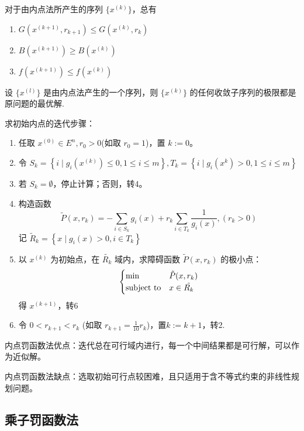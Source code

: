 \begin{theorem}
    对于由内点法所产生的序列 $\{x^{(k)}\}$，总有\begin{enumerate}
        \item $G(x^{(k + 1)}, r_{k + 1}) \le G(x^{(k)}, r_k)$
        \item $B(x^{(k + 1)}) \ge B(x^{(k)})$
        \item $f(x^{(k + 1)}) \le f(x^{(k)})$
    \end{enumerate}
\end{theorem}

\begin{theorem}
    设 $\{x^{(l)}\}$ 是由内点法产生的一个序列，则 $\{x^{(k)}\}$ 的任何收敛子序列的极限都是原问题的最优解.
\end{theorem}

\begin{remark}
    求初始内点的迭代步骤：\begin{enumerate}
        \item 任取 $x^{(0)} \in E^n, r_0 > 0$(如取 $r_0 = 1$)，置 $k := 0$。
        \item 令 $S_k = \left\{i \mid g_i(x^{(k)}) \le 0, 1 \le i \le m\right\}, T_k = \left\{i \mid g_i(x^{k}) > 0, 1 \le i \le m\right\}$
        \item 若 $S_k = \emptyset$，停止计算；否则，转4。
        \item 构造函数 \[\widetilde{P}\left(x, r_{k}\right)=-\sum_{i \in S_{k}} g_{i}(x)+r_{k} \sum_{i \in T_{k}} \frac{1}{g_{i}(x)},\left(r_{k}>0\right)\]
        记 $\widetilde{R}_{k}=\left\{x \mid g_{i}(x)>0 ,i \in T_{k}\right\}$
        \item 以 $x^{(k)}$ 为初始点，在 $\tilde{R_k}$ 域内，求障碍函数 $\tilde{P}(x, r_k)$ 的极小点：\[\begin{cases}
            \min &\tilde{P}(x, r_k)\\
            \operatorname{subject\ to} & x \in \tilde{R_k}
        \end{cases}\] 得 $x^{(k + 1)}$，转6
        \item 令 $ 0 < r_{k + 1} < r_k$ (如取 $r_{k + 1} = \frac{1}{10}r_k$)，置$k:=k+1$，转2.
    \end{enumerate}
\end{remark}

\begin{remark}
    内点罚函数法优点：迭代总在可行域内进行，每一个中间结果都是可行解，可以作为近似解。

    内点罚函数法缺点：选取初始可行点较困难，且只适用于含不等式约束的非线性规划问题。
\end{remark}

\subsection{乘子罚函数法}



